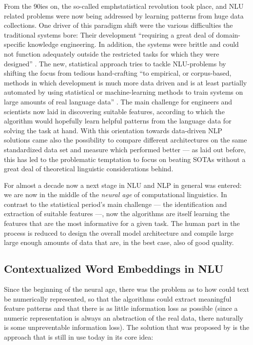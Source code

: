 From the 90ies on, the so-called emph{statistical revolution} took place, and NLU related
problems were now being addressed by learning patterns from huge data collections. One driver
of this paradigm shift were the various difficulties the traditional systems bore: Their
development ``requiring a great deal of domain-specific knowledge engineering. In addition,
the systems were brittle and could not function adequately outside the restricted tasks for
which they were designed'' \citep[p.~13]{brill1997overview}. The new, statistical {\color{red}
approach} tries to tackle NLU-problems by shifting the focus from tedious hand-crafting ``to
empirical, or corpus-based, methods in which development is much more data driven and is at
least partially automated by using statistical or machine-learning methods to train systems
on large amounts of real language data'' \citep[p.~13]{brill1997overview}. The main challenge
for engineers and scientists now laid in discovering suitable features, according to which the
algorithm would hopefully learn helpful patterns from the language data for solving the task
at hand. With this orientation towards data-driven NLP solutions came also the possibility to
compare different architectures on the same standardized data set and measure which performed
better --- as laid out before, this has led to the problematic temptation to focus on beating
SOTAs without a great deal of theoretical linguistic considerations behind.

For almost a decade now a next stage in NLU and NLP in general was entered: we are now in the
middle of the \emph{neural age} of computational linguistics. In contrast to the statistical
period's main challenge --- the identification and extraction of suitable features ---, now the
algorithms are itself learning the features that are the most informative for a given task. The
human part in the process is reduced to design the overall model architecture and compile large
large enough amounts of data that are, in the best case, also of good quality.


\subsection{Contextualized Word Embeddings in NLU}

Since the beginning of the neural age, there was the problem as to how could text be numerically
represented, so that the algorithms could extract meaningful feature patterns and
that there is as little information loss as possible (since a numeric representation is always
an abstraction of the real data, there naturally is some unpreventable information loss).
The solution that was proposed by \cite{mikolov2013distributed} is the approach that is still
in use today in its core idea:

